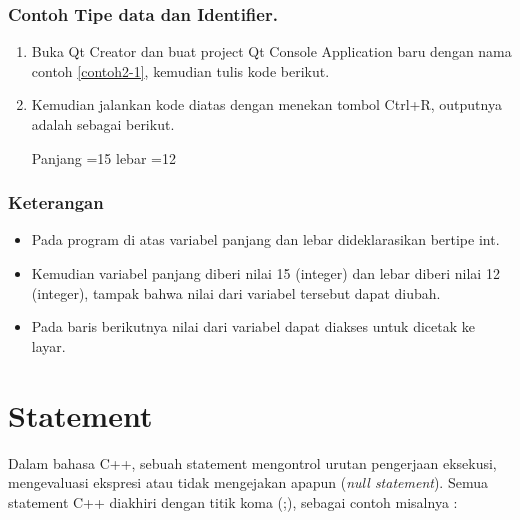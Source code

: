 \subsubsection*{Contoh Tipe data dan Identifier.}

\begin{enumerate}

\item
 Buka Qt Creator dan buat project Qt Console Application baru dengan
 nama contoh \ref{contoh2-1}, kemudian tulis kode berikut.



\item
 Kemudian jalankan kode diatas dengan menekan tombol Ctrl+R, outputnya
 adalah sebagai berikut.

\begin{lcverbatim}
Panjang =15
lebar =12
\end{lcverbatim}

\end{enumerate}


\subsubsection*{Keterangan}

\begin{itemize}

\item
 Pada program di atas variabel panjang dan lebar dideklarasikan bertipe
 int.
\item
 Kemudian variabel panjang diberi nilai 15 (integer) dan lebar diberi
 nilai 12 (integer), tampak bahwa nilai dari variabel tersebut dapat
 diubah.
\item
 Pada baris berikutnya nilai dari variabel dapat diakses untuk dicetak
 ke layar.
\end{itemize}

\section{Statement}\label{statement}

Dalam bahasa C++, sebuah statement mengontrol urutan pengerjaan
eksekusi, mengevaluasi ekspresi atau tidak mengejakan apapun (\emph{null
statement}). Semua statement C++ diakhiri dengan titik koma (;), sebagai
contoh misalnya :



